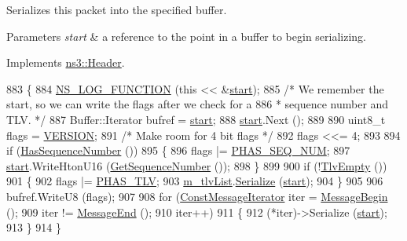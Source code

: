 Serializes this packet into the specified buffer. 


\begin{DoxyParams}{Parameters}
{\em start} & a reference to the point in a buffer to begin serializing. \\
\hline
\end{DoxyParams}


Implements \hyperlink{classns3_1_1Header_afb61f1aac69ff8349a6bfe521fab5404}{ns3\+::\+Header}.


\begin{DoxyCode}
883 \{
884   \hyperlink{log-macros-disabled_8h_a90b90d5bad1f39cb1b64923ea94c0761}{NS\_LOG\_FUNCTION} (\textcolor{keyword}{this} << &\hyperlink{namespacevisualizer_1_1core_a2a35e5d8a34af358b508dac8635754e0}{start});
885   \textcolor{comment}{/* We remember the start, so we can write the flags after we check for a}
886 \textcolor{comment}{   * sequence number and TLV. */}
887   Buffer::Iterator bufref = \hyperlink{namespacevisualizer_1_1core_a2a35e5d8a34af358b508dac8635754e0}{start};
888   \hyperlink{namespacevisualizer_1_1core_a2a35e5d8a34af358b508dac8635754e0}{start}.Next ();
889 
890   uint8\_t flags = \hyperlink{packetbb_8cc_a962e6273877a312113abc84646539068}{VERSION};
891   \textcolor{comment}{/* Make room for 4 bit flags */}
892   flags <<= 4;
893 
894   \textcolor{keywordflow}{if} (\hyperlink{classns3_1_1PbbPacket_a1dbfa2209a94926f31f1f943553e148f}{HasSequenceNumber} ())
895     \{
896       flags |= \hyperlink{packetbb_8cc_a5308ec13dafe8b9ad8aba2824f3a829b}{PHAS\_SEQ\_NUM};
897       \hyperlink{namespacevisualizer_1_1core_a2a35e5d8a34af358b508dac8635754e0}{start}.WriteHtonU16 (\hyperlink{classns3_1_1PbbPacket_ae512a98f95a9115e29d9040f29c444e2}{GetSequenceNumber} ());
898     \}
899 
900   \textcolor{keywordflow}{if} (!\hyperlink{classns3_1_1PbbPacket_afc05204e82df389edaf180b678d8c3fd}{TlvEmpty} ())
901     \{
902       flags |= \hyperlink{packetbb_8cc_ab5df0d54fe036af57bbdb86cbb668ca2}{PHAS\_TLV};
903       \hyperlink{classns3_1_1PbbPacket_af24e9b73e6b1d8c113b52041860e9a35}{m\_tlvList}.\hyperlink{classns3_1_1PbbTlvBlock_a1c825abcdf9a3526efbf4b35218ab85b}{Serialize} (\hyperlink{namespacevisualizer_1_1core_a2a35e5d8a34af358b508dac8635754e0}{start});
904     \}
905 
906   bufref.WriteU8 (flags);
907 
908   \textcolor{keywordflow}{for} (\hyperlink{classns3_1_1PbbPacket_a59b58a11ce8de2cc2ff3c7fd7c4f1d10}{ConstMessageIterator} iter = \hyperlink{classns3_1_1PbbPacket_a78d131c19a9179e3e48427ae35705dc1}{MessageBegin} ();
909        iter != \hyperlink{classns3_1_1PbbPacket_a216fc11ab7b3cb96b5565f05b63b4e96}{MessageEnd} ();
910        iter++)
911     \{
912       (*iter)->Serialize (\hyperlink{namespacevisualizer_1_1core_a2a35e5d8a34af358b508dac8635754e0}{start});
913     \}
914 \}
\end{DoxyCode}


